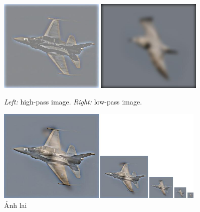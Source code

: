 \begin{figure}[H]
    \centering
    \includegraphics[width=5cm]{images/results_part2/bird_plane/high_frequencies.jpg}
    \includegraphics[width=5cm]{images/results_part2/bird_plane/low_frequencies.jpg}
    \caption{\emph{Left:} high-pass image. \emph{Right:} low-pass image.}
\end{figure}
\begin{figure}[H]
    \centering
    \includegraphics[width=10cm]{images/results_part2/bird_plane/hybrid_image_scales.jpg}
    \caption{Ảnh lai}
\end{figure}


